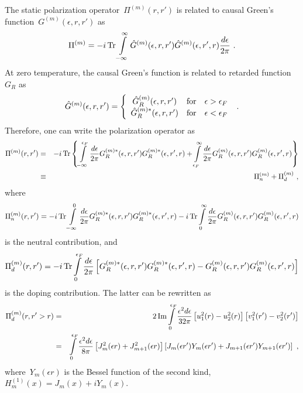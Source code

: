 \documentclass[preprint,aps,prb]{revtex4}
\begin{document}
The static polarization operator~$\Pi^{(m)}(r, r')$ is related to causal
Green's function~$G^{(m)}(\epsilon, r, r')$ as
\begin{equation}
\Pi^{(m)} = -i \mathop{\rm Tr}\nolimits 
\int\limits_{-\infty}^{\infty} 
\hat{G}^{(m)}(\epsilon, r, r') 
\hat{G}^{(m)}(\epsilon, r', r) \frac{d\epsilon}{2\pi}
\ .
\end{equation}
At zero temperature, the causal Green's function is related to retarded
function~$G_R$ as
\begin{equation}
\hat{G}^{(m)} (\epsilon, r, r') = 
\left\{
   \begin{array}{ccc}
   \hat{G}^{(m)}_R (\epsilon, r, r') & {\rm for} & \epsilon > \epsilon_F \\ 
   \hat{G}^{(m)\ast}_R (\epsilon, r, r') & {\rm for} & \epsilon < \epsilon_F 
   \end{array}
\right.
\ .
\end{equation}
Therefore, one can write the polarization operator as 
\begin{eqnarray}
\Pi^{(m)}(r, r') &=& -i \mathop{\rm Tr}\nolimits 
\left\{
\int\limits_{-\infty}^{\epsilon_F} 
\frac{d\epsilon}{2\pi}
G_R^{(m)\ast} (\epsilon, r, r') G_R^{(m)\ast} (\epsilon, r', r)
+
 \int\limits_{\epsilon_F}^{\infty} \frac{d\epsilon}{2\pi}
 G_R^{(m)} (\epsilon, r, r') G_R^{(m)} (\epsilon, r', r)
 \right\}
\nonumber
\\
 &\equiv& \Pi_n^{(m)} + \Pi_d^{(m)} 
 \ , 
\end{eqnarray}
where
\begin{equation}
\Pi_n^{(m)}(r, r') = 
-i \mathop{\rm Tr}\nolimits 
\int\limits_{-\infty}^{0} \frac{d\epsilon}{2\pi}
G_R^{(m)\ast} (\epsilon, r, r') G_R^{(m)\ast} (\epsilon, r', r)
-i \mathop{\rm Tr}\nolimits 
\int\limits_{0}^{\infty} \frac{d\epsilon}{2\pi}
G_R^{(m)} (\epsilon, r, r') G_R^{(m)} (\epsilon, r', r)
\end{equation}
is the neutral contribution, and
\begin{equation}
\Pi_d^{(m)}(r, r') = -i \mathop{\rm Tr}\nolimits
\int\limits_{0}^{\epsilon_F} \frac{d\epsilon}{2\pi} \left[
G_R^{(m)\ast} (\epsilon, r, r') G_R^{(m)\ast} (\epsilon, r', r)
- G_R^{(m)} (\epsilon, r, r') G_R^{(m)} (\epsilon, r', r)
\right]
\end{equation}
is the doping contribution. The latter can be rewritten as
\begin{eqnarray}
\label{Pi-d}
\Pi_d^{(m)}(r, r' > r) &=& 2 \mathop{\rm Im}\nolimits
\int\limits_{0}^{\epsilon_F} \frac{\epsilon^2 d\epsilon}{32 \pi}
\left[u_1^2(r) - u_2^2(r)\right] \left[v_1^2(r') - v_2^2(r')\right]
\\
&=& \int\limits_{0}^{\epsilon_F} \frac{\epsilon^2 d\epsilon}{8\pi}
\left[J_m^2(\epsilon r) + J_{m + 1}^2(\epsilon r)\right]
\left[J_m(\epsilon r')Y_m(\epsilon r') 
    + J_{m + 1}(\epsilon r')Y_{m + 1}(\epsilon r')\right]
    \ , 
\nonumber
\end{eqnarray}
where~$Y_{m}(\epsilon r)$ is the Bessel function of the second kind, 
$H_m^{(1)}(x) = J_m(x) + i Y_m(x)$.
\end{document}
